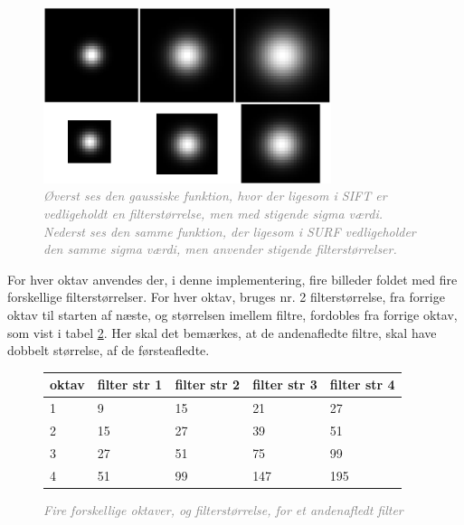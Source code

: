 \begin{figure}[H]
    \centering
    \includegraphics[width=0.75\textwidth]{fig/34.png}
     \vspace{-0.5em}
    \begin{center}    
       \caption{\textcolor{gray}{\footnotesize \textit{Øverst ses den gaussiske funktion, hvor der ligesom i SIFT er vedligeholdt en filterstørrelse, men med stigende sigma værdi. Nederst ses den samme funktion, der ligesom i SURF vedligeholder den samme sigma værdi, men anvender stigende filterstørrelser.}}}
    \label{fig:siftsurf}
     \end{center}
     \vspace{-1.5em}
  \end{figure} \noindent
For hver oktav anvendes der, i denne implementering, fire billeder foldet med fire forskellige filterstørrelser. For hver oktav, bruges nr. 2 filterstørrelse, fra forrige oktav til starten af næste, og størrelsen imellem filtre, fordobles fra forrige oktav, som vist i tabel \ref{fig:secderivfiltersize}. Her skal det bemærkes, at de andenafledte filtre, skal have dobbelt størrelse, af de førsteafledte.
\begin{figure}[H]
    \centering
    \begin{center}    
    \begin{tabular}{ | l | l | l | l | l |}
    \hline
    oktav & filter str 1 & filter str 2 & filter str 3 & filter str 4 \\ \hline
    1 & 9 & 15 & 21 & 27 \\ \hline
  	2 & 15 & 27 & 39 & 51 \\ \hline
  	3 & 27 & 51 & 75 & 99 \\ \hline
  	4 & 51 & 99 & 147 & 195 \\ \hline
    \end{tabular}       
    \caption{\textcolor{gray}{\footnotesize \textit{Fire forskellige oktaver, og filterstørrelse, for et andenafledt filter}}}
    \label{fig:secderivfiltersize}
     \end{center}
     \vspace{-2.5em}
  \end{figure} \noindent
